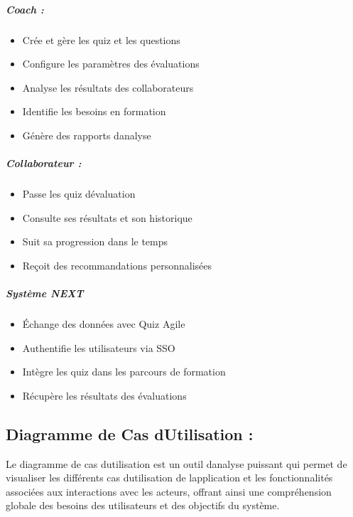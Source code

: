 \documentclass[12pt,a4paper,twoside]{report}
\begin{document}
\hypertarget{coach}{%
\subparagraph{Coach :}\label{coach}}

\begin{itemize}
\item
  Crée et gère les quiz et les questions
\item
  Configure les paramètres des évaluations
\item
  Analyse les résultats des collaborateurs
\item
  Identifie les besoins en formation
\item
  Génère des rapports d\textquotesingle analyse
\end{itemize}

\hypertarget{collaborateur}{%
\subparagraph{Collaborateur :}\label{collaborateur}}

\begin{itemize}
\item
  Passe les quiz d\textquotesingle évaluation
\item
  Consulte ses résultats et son historique
\item
  Suit sa progression dans le temps
\item
  Reçoit des recommandations personnalisées
\end{itemize}

\hypertarget{systuxe8me-next}{%
\subparagraph{Système NEXT}\label{systuxe8me-next}}

\begin{itemize}
\item
  Échange des données avec Quiz Agile
\item
  Authentifie les utilisateurs via SSO
\item
  Intègre les quiz dans les parcours de formation
\item
  Récupère les résultats des évaluations
\end{itemize}

\hypertarget{diagramme-de-cas-dutilisation}{%
\subsection{Diagramme de Cas d\textquotesingle Utilisation
:}\label{diagramme-de-cas-dutilisation}}

Le diagramme de cas d\textquotesingle utilisation est un outil
d\textquotesingle analyse puissant qui permet de visualiser les
différents cas d\textquotesingle utilisation de
l\textquotesingle application et les fonctionnalités associées aux
interactions avec les acteurs, offrant ainsi une compréhension globale
des besoins des utilisateurs et des objectifs du système.
\end{document}
